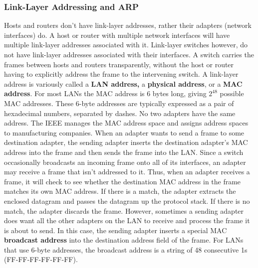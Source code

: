 \subsubsection{Link-Layer Addressing and ARP}
Hosts and routers don't have link-layer addresses, rather their adapters (network interfaces) do. A host or router with multiple network interfaces will have multiple link-layer addresses associated with it. Link-layer switches however, do not have link-layer addresses associated with their interfaces. A switch carries the frames between hosts and routers transparently, without the host or router having to explicitly address the frame to the intervening switch. A link-layer address is variously called a \textbf{LAN address,} a \textbf{physical address}, or a \textbf{MAC address}. For most LANs the MAC address is 6 bytes long, giving $2^{48}$ possible MAC addresses. These 6-byte addresses are typically expressed as a pair of hexadecimal numbers, separated by dashes. No two adapters have the same address. The IEEE manages the MAC address space and assigns address spaces to manufacturing companies. When an adapter wants to send a frame to some destination adapter, the sending adapter inserts the destination adapter's MAC address into the frame and then sends the frame into the LAN. Since a switch occasionally broadcasts an incoming frame onto all of its interfaces, an adapter may receive a frame that isn't addressed to it. Thus, when an adapter receives a frame, it will check to see whether the destination MAC address in the frame matches its own MAC address. If there is a match, the adapter extracts the enclosed datagram and passes the datagram up the protocol stack. If there is no match, the adapter discards the frame. However, sometimes a sending adapter does want all the other adapters on the LAN to receive and process the frame it is about to send. In this case, the sending adapter inserts a special MAC \textbf{broadcast address} into the destination address field of the frame. For LANs that use 6-byte addresses, the broadcast address is a string of 48 consecutive 1s (FF-FF-FF-FF-FF-FF).\vspace{.3cm}\\

